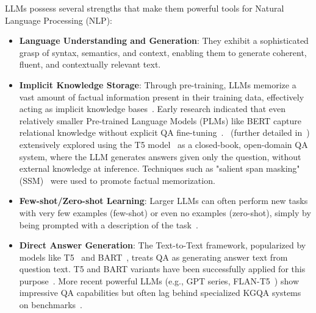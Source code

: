 LLMs possess several strengths that make them powerful tools for Natural Language Processing (NLP):
\begin{itemize}
    \item \textbf{Language Understanding and Generation}: They exhibit a sophisticated grasp of syntax, semantics, and context, enabling them to generate coherent, fluent, and contextually relevant text.
    \item \textbf{Implicit Knowledge Storage}: Through pre-training, LLMs memorize a vast amount of factual information present in their training data, effectively acting as implicit knowledge bases~\cite{petroni-etal-2019-language}. Early research indicated that even relatively smaller Pre-trained Language Models (PLMs) like BERT capture relational knowledge without explicit QA fine-tuning~\cite{petroni-etal-2019-language}.~\cite{DBLP:conf/emnlp/RobertsRS20} (further detailed in~\cite{DBLP:journals/jmlr/RaffelSRLNMZLL20-t5ssm}) extensively explored using the T5 model~\cite{DBLP:journals/corr/abs-1910-10683} as a closed-book, open-domain QA system, where the LLM generates answers given only the question, without external knowledge at inference. Techniques such as "salient span masking" (SSM)~\cite{DBLP:journals/corr/abs-1910-10683} were used to promote factual memorization.
    \item \textbf{Few-shot/Zero-shot Learning}: Larger LLMs can often perform new tasks with very few examples (few-shot) or even no examples (zero-shot), simply by being prompted with a description of the task~\cite{DBLP:conf/nips/BrownMRSKDNSSAA20}.
    \item \textbf{Direct Answer Generation}: The Text-to-Text framework, popularized by models like T5~\cite{DBLP:journals/corr/abs-1910-10683} and BART~\cite{DBLP:conf/acl/bart}, treats QA as generating answer text from question text. T5 and BART variants have been successfully applied for this purpose~\cite{DBLP:conf/emnlp/RobertsRS20, DBLP:conf/eacl/IzacardG21, DBLP:conf/acl/CaoSPNX0LHZ22}. More recent powerful LLMs (e.g., GPT series, FLAN-T5~\cite{DBLP:journals/corr/abs-2210-11416}) show impressive QA capabilities but often lag behind specialized KGQA systems on benchmarks~\cite{tan2023evaluation}.
\end{itemize}

